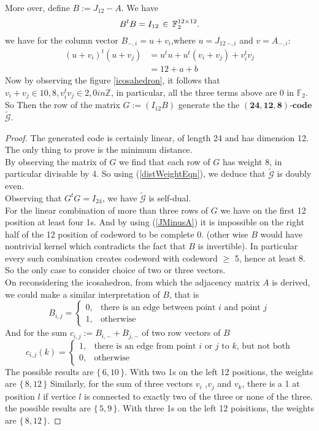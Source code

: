 \documentclass{article}
\numberwithin{equation}{theorem}
\numberwithin{figure}{theorem}
\newcommand{\Ftwo}{\ensuremath{\mathbb{F}_2}}
\newcommand{\cCodes}{\ensuremath{\widetilde{\mathscr{G}}}}
\newcommand{\linearCode}[3]{\ensuremath{\bm{(#1,#2,#3)\mbox{-}code}}}
\newcommand{\myMatrixRing}[2]{\ensuremath{#1^{#2\times#2}}}
\newcommand{\Integer}{\ensuremath{\mathbb{Z}}}
\begin{document}
More over, define $B := J_{12} - A$. We have 
\begin{equation}\label{JMinusA}
	B^tB = I_{12} \,\in \,{\myMatrixRing{\Ftwo}{12}}.\\
\end{equation}
we have for the column vector $B_{-,i} = u + v_i$,where $u = J_{12\,-,i}$ and $v = A_{-,i}$:
\begin{align*}
	(u + v_i)^t(u + v_j) &= u^tu + u^t(v_i + v_j) + v_i^tv_j\\
						 &= 12 + a + b
\end{align*}
Now by observing the figure \ref{icosahedron}, it follows that
$v_i + v_j \in {10,8}, v_i^tv_j \in {2,0} in \Integer$, in particular, all the three terms above are 0 in $\Ftwo$. So 
Then the row of the matrix $G := (I_{12} B)$ generate the the {\linearCode{24}{12}{8}} \cCodes.
\begin{proof}
The generated code is certainly linear, of length 24 and has dimension 12. The only thing to prove is the minimum distance.\\
By observing the matrix of $G$ we find that each row of $G$ has weight 8, in particular divisable by 4. So using (\ref{distWeightEqn}), we deduce that {\cCodes} is doubly even.\\
Observing that $G^tG = I_{24}$, we have {\cCodes} is self-dual.\\
For the linear combination of more than three rows of $G$ we have on the first 12 position at least four 1s. And by using (\ref{JMinusA}) it is impossible on the right half of the 12 position of codeword to be complete 0. (other wise $B$ would have nontrivial kernel which contradicts the fact that $B$ is invertible). In particular every such combination creates codeword with codeword $\geq$ 5, hence at least 8. So the only case to consider choice of two or three vectors. \\
On reconsidering the icosahedron, from which the adjacency matrix $A$ is derived, we could make a similar interpretation of $B$, that is 
\[
	B_{i,j} = 
	\begin{cases}
		0, &\text{there is an edge between point $i$ and point $j$}\\
		1, &\text{otherwise}
	\end{cases}
\]
And for the sum $c_{i,j} := B_{i,-} + B_{j,-} $ of two row vectors of $B$
\[
	c_{i,j}(k) = 
	\begin{cases}
		1, &\text{there is an edge from point $i$ or $j$ to $k$, but not both}\\
		0, &\text{otherwise}
	\end{cases}
\]
The possible results are $\{\,6,10\,\}$. With two 1s on the left 12 positions,  the weights are $\{\,8,12\,\}$
Similarly, for the sum of three vectors $v_i$ ,$v_j$ and $v_k$, there is a 1 at position $l$ if vertice $l$ is connected to exactly two of the three or none of the three.
  the possible results are $\{\,5,9\,\}$. With three 1s on the left 12 poisitions, the weights are $\{\,8,12\,\}$. 
\end{proof}
\end{document}
